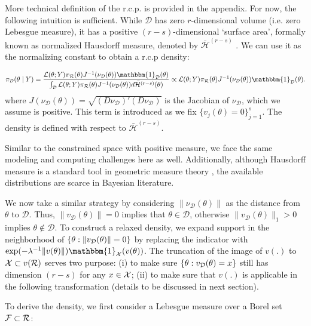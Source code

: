 \documentclass[10pt,fleqn]{article} \pdfoutput=1
\DeclareMathOperator{\1}{\mathbbm{1}} \DeclareMathOperator{\bigO}{\mc O}
\begin{document}
More technical definition of the r.c.p. is provided in the appendix. For
now, the following intuition is sufficient. While $\mathcal{D}$ has zero
$r$-dimensional volume (i.e. zero Lebesgue measure), it has a positive
$(r-s)$-dimensional `surface area', formally known as normalized Hausdorff
measure, denoted by $\bar{\mathcal{H}}^{(r-s)}$ . We can use it as the
normalizing constant to obtain a r.c.p density:

$$\pi_{\mc D}(\theta \mid Y) = \dfrac{
{\mathcal{L}(\theta;Y)\pi_\mathcal{R}(\theta)}{J^{-1}(\nu_\mathcal{D}(\theta))
\mathbbm{1}_{\mc D}(\theta)
}
} {\int_\mathcal{D}
{\mathcal{L}(\theta;Y)\pi_\mathcal{R}(\theta)}{J^{-1}(\nu_\mathcal{D}(\theta))}
d\bar{\mathcal{H}}^{(r-s)}(\theta)} \propto
{\mathcal{L}(\theta;Y)\pi_\mathcal{R}(\theta)}{J^{-1}(\nu_\mathcal{D}(\theta))
\mathbbm{1}_{\mc D}(\theta)
}.
$$
where $J(\nu_\mathcal{D}(\theta)) =
\sqrt{(D\nu_\mathcal{D})'(D\nu_\mathcal{D})}$ is the Jacobian
of $\nu_\mathcal{D}$, which we assume is positive. This term is
introduced as we fix $\{v_j(\theta)=0\}_{j=1}^{s}$.  The density is
defined with respect to $\bar{\mathcal{H}}^{(r-s)}$.

Similar to the constrained space with positive measure, we face the
same modeling and computing challenges here as well.  Additionally,
although Hausdorff measure is a standard tool in geometric measure theory
\citep{federer2014geometric}, the available distributions are scarce in
Bayesian literature.

We now take a similar strategy by considering $\|\nu_\mathcal{D}(\theta)\|$ as
the distance from $\theta$ to $\mathcal{D}.$ Thus, $\|v_\mathcal{D}(\theta)\| =
0$ implies that $\theta \in \mathcal{D}$, otherwise
$\|v_\mathcal{D}(\theta)\|_1 >0$ implies $\theta\notin\mathcal{D}.$
To construct a relaxed density, we expand support in the neighborhood of
$\{\theta:\|v_{\mathcal{D}}(\theta)\|=0\}$ by replacing the indicator with $\exp(
-{\lambda^{-1}}\|v(\theta)\|) \mathbbm{1}_{\mc X}(v(\theta))$. The truncation
of the image of $v(.)$ to $\mathcal{X}\subset v(\mathcal{R})$ serves two purpose: (i)
to make sure $\{\theta:v_{\mathcal{D}}(\theta)=x\}$ still has dimension $(r-s)$
for any $x\in \mathcal{X}$; (ii) to make sure that $v(.)$ is applicable in the
following transformation (details to be discussed in next section).

To derive the density, we first
consider a Lebesgue measure over a Borel set $\mathcal{F} \subset \mathcal{R}$:
\end{document}
